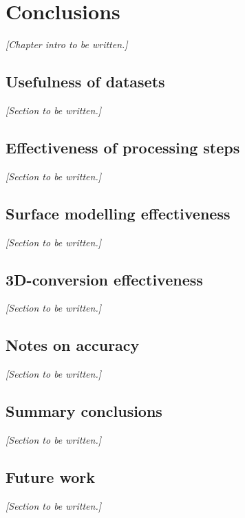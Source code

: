 
\chapter{Conclusions}
\label{chap:c}

\textit{[Chapter intro to be written.]}

\section{Usefulness of datasets}
\label{sec:usefulness}

\textit{[Section to be written.]}

\section{Effectiveness of processing steps}
\label{sec:effectivenessprocessing}

\textit{[Section to be written.]}

\section{Surface modelling effectiveness}
\label{sec:effectivenessmodelling}

\textit{[Section to be written.]}

\section{3D-conversion effectiveness}
\label{sec:effectivenessconversion}

\textit{[Section to be written.]}

\section{Notes on accuracy}
\label{sec:notesaccuracy}

\textit{[Section to be written.]}

\section{Summary conclusions}
\label{sec:conclusions}

\textit{[Section to be written.]}

\section{Future work}
\label{sec:futurework}

\textit{[Section to be written.]}